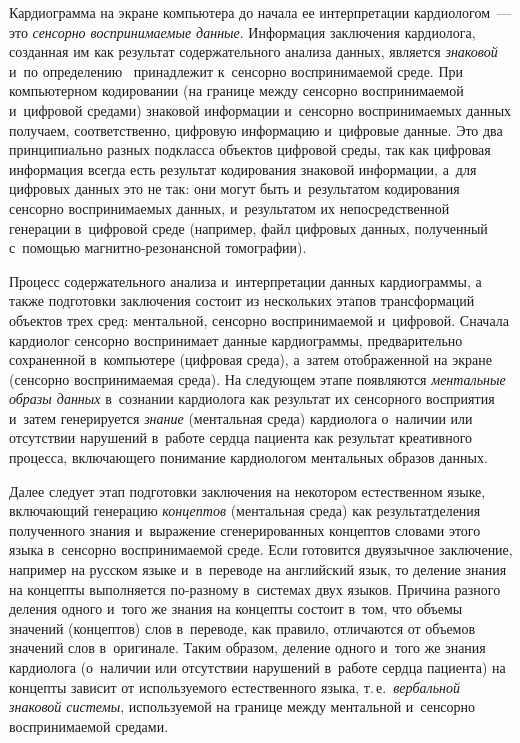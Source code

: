 \begin{multicols}{2}
    Кардиограмма на экране компьютера до начала ее интерпретации 
кардиологом~--- это \textit{сенсорно воспринимаемые данные}. Информация 
заключения кардиолога, созданная им как результат содержательного анализа 
данных, является \textit{знаковой} и~по определению~\cite{25-zac} 
принадлежит к~сенсорно воспринимаемой среде. При компьютерном 
кодировании (на границе меж\-ду сенсорно вос\-при\-ни\-ма\-емой и~циф\-ро\-вой 
средами) знаковой информации и~сенсорно вос\-при\-ни\-ма\-емых данных получаем, 
соответственно, циф\-ро\-вую информацию и~циф\-ро\-вые данные. Это два 
принципиально разных подкласса объектов циф\-ро\-вой среды, так как цифровая 
информация всегда есть результат кодирования знаковой информации, а~для 
циф\-ро\-вых данных это не так: они могут быть и~результатом кодирования 
сенсорно вос\-при\-ни\-ма\-емых данных, и~результатом их непосредственной 
генерации в~циф\-ро\-вой среде (например, файл циф\-ро\-вых данных, полученный  
с~по\-мощью маг\-нит\-но-ре\-зо\-нанс\-ной томографии).
    
    Процесс содержательного анализа и~интерпретации данных кардиограммы, 
а также подготовки заключения состоит из нескольких этапов трансформаций 
объектов трех сред: ментальной, сенсорно воспринимаемой и~цифровой. 
Сначала кардиолог сенсорно воспринимает данные кардиограммы, 
предварительно сохраненной в~компьютере (циф\-ро\-вая среда), а~затем 
отобра\-жен\-ной на экране (сенсорно вос\-при\-ни\-ма\-емая среда). На сле\-ду\-ющем 
этапе появляются \textit{ментальные образы данных} в~сознании кардиолога 
как результат их сенсорного восприятия и~затем генерируется \textit{знание} 
(ментальная среда) кардиолога о~наличии или отсутствии нарушений в~работе 
серд\-ца пациента как результат креативного процесса, вклю\-ча\-юще\-го понимание 
кардиологом ментальных образов данных.
    
    Далее следует этап подготовки заключения на некотором естественном 
языке, включающий генерацию \textit{концептов} (ментальная среда) как 
результат\linebreak деления полученного знания и~выражение сге\-не\-рированных 
концептов словами этого языка в~сен\-сорно воспринимаемой среде. Если 
готовится двуязычное заключение, например на русском языке и~в~\mbox{переводе} на 
английский язык, то деление знания на концепты выполняется по-раз\-но\-му  
в~сис\-те\-мах двух языков. Причина разного деления одного и~того же знания 
на концепты состоит в~том, что объемы значений (концептов) слов в~переводе, 
как правило, отличаются от объемов значений слов в~оригинале. Таким 
образом, деление одного и~того же знания кардиолога (о~наличии или 
отсутствии нарушений в~работе сердца пациента) на концепты зависит от 
используемого естественного языка, т.\,е.\ \textit{вербальной знаковой 
системы}, используемой на границе между ментальной и~сенсорно 
воспринимаемой средами.
    

\end{multicols}
